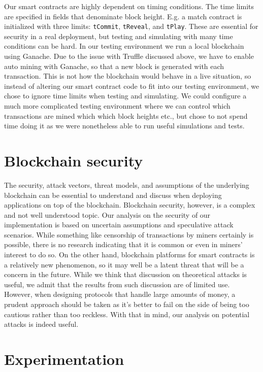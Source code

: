 Our smart contracts are highly dependent on timing conditions. The time limits are specified in fields that denominate block height. E.g. a match contract is initialized with three limits: \texttt{tCommit}, \texttt{tReveal}, and \texttt{tPlay}. These are essential for security in a real deployment, but testing and simulating with many time conditions can be hard. In our testing environment we run a local blockchain using Ganache. Due to the issue with Truffle discussed above, we have to enable auto mining with Ganache, so that a new block is generated with each transaction. This is not how the blockchain would behave in a live situation, so instead of altering our smart contract code to fit into our testing environment, we chose to ignore time limits when testing and simulating. We could configure a much more complicated testing environment where we can control which transactions are mined which which block heights etc., but chose to not spend time doing it as we were nonetheless able to run useful simulations and tests. 

\section{Blockchain security}
\label{sec:discussion-security}

The security, attack vectors, threat models, and assumptions of the underlying blockchain can be essential to understand and discuss when deploying applications on top of the blockchain. Blockchain security, however, is a complex and not well understood topic. Our analysis on the security of our implementation is based on uncertain assumptions and speculative attack scenarios. While something like censorship of transactions by miners certainly is possible, there is no research indicating that it is common or even in miners' interest to do so. On the other hand, blockchain platforms for smart contracts is a relatively new phenomenon, so it may well be a latent threat that will be a concern in the future. While we think that discussion on theoretical attacks is useful, we admit that the results from such discussion are of limited use. However, when designing protocols that handle large amounts of money, a prudent approach should be taken as it's better to fail on the side of being too cautious rather than too reckless. With that in mind, our analysis on potential attacks is indeed useful. 

\section{Experimentation}
\label{sec:experimentation}

